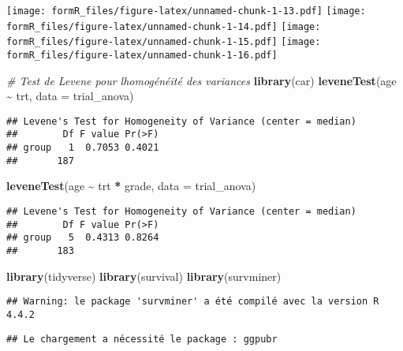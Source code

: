 \documentclass[
]{article}
\newenvironment{Shaded}{\begin{snugshade}}{\end{snugshade}}
\newcommand{\AttributeTok}[1]{\textcolor[rgb]{0.13,0.29,0.53}{#1}}
\newcommand{\CommentTok}[1]{\textcolor[rgb]{0.56,0.35,0.01}{\textit{#1}}}
\newcommand{\FunctionTok}[1]{\textcolor[rgb]{0.13,0.29,0.53}{\textbf{#1}}}
\newcommand{\NormalTok}[1]{#1}
\newcommand{\SpecialCharTok}[1]{\textcolor[rgb]{0.81,0.36,0.00}{\textbf{#1}}}
\begin{document}
\texttt{[image: formR\_files/figure-latex/unnamed-chunk-1-13.pdf]}
\texttt{[image: formR\_files/figure-latex/unnamed-chunk-1-14.pdf]}
\texttt{[image: formR\_files/figure-latex/unnamed-chunk-1-15.pdf]}
\texttt{[image: formR\_files/figure-latex/unnamed-chunk-1-16.pdf]}

\begin{Shaded}
\begin{Highlighting}[]
\CommentTok{\# Test de Levene pour l\textquotesingle{}homogénéité des variances}
\FunctionTok{library}\NormalTok{(car)}
\FunctionTok{leveneTest}\NormalTok{(age }\SpecialCharTok{\textasciitilde{}}\NormalTok{ trt, }\AttributeTok{data =}\NormalTok{ trial\_anova)}
\end{Highlighting}
\end{Shaded}

\begin{verbatim}
## Levene's Test for Homogeneity of Variance (center = median)
##        Df F value Pr(>F)
## group   1  0.7053 0.4021
##       187
\end{verbatim}

\begin{Shaded}
\begin{Highlighting}[]
\FunctionTok{leveneTest}\NormalTok{(age }\SpecialCharTok{\textasciitilde{}}\NormalTok{ trt }\SpecialCharTok{*}\NormalTok{ grade, }\AttributeTok{data =}\NormalTok{ trial\_anova)}
\end{Highlighting}
\end{Shaded}

\begin{verbatim}
## Levene's Test for Homogeneity of Variance (center = median)
##        Df F value Pr(>F)
## group   5  0.4313 0.8264
##       183
\end{verbatim}

\begin{Shaded}
\begin{Highlighting}[]
\FunctionTok{library}\NormalTok{(tidyverse)}
\FunctionTok{library}\NormalTok{(survival)}
\FunctionTok{library}\NormalTok{(survminer)}
\end{Highlighting}
\end{Shaded}

\begin{verbatim}
## Warning: le package 'survminer' a été compilé avec la version R 4.4.2
\end{verbatim}

\begin{verbatim}
## Le chargement a nécessité le package : ggpubr
\end{verbatim}
\end{document}
